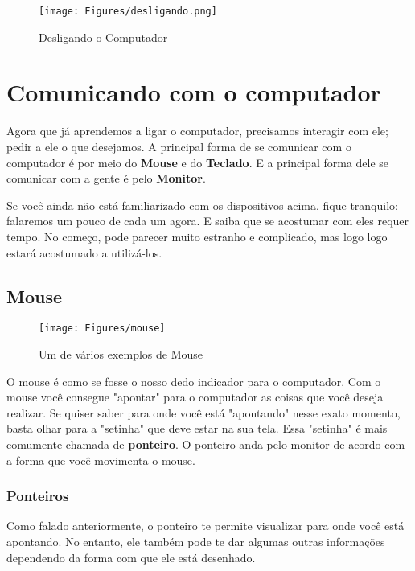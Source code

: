 \documentclass[hidelinks,12pt]{article}
\begin{document}
\begin{figure}[!h]
	\centering
	\texttt{[image: Figures/desligando.png]}
	\caption{Desligando o Computador}
	\label{fig:desligando}
\end{figure}

\newpage

\section{Comunicando com o computador}

Agora que já aprendemos a ligar o computador, precisamos interagir com ele; pedir a ele o que desejamos. A principal forma de se comunicar com o computador é por meio do \textbf{Mouse} e do \textbf{Teclado}. E a principal forma dele se comunicar com a gente é pelo \textbf{Monitor}.

Se você ainda não está familiarizado com os dispositivos acima, fique tranquilo; falaremos um pouco de cada um agora. E saiba que se acostumar com eles requer tempo. No começo, pode parecer muito estranho e complicado, mas logo logo estará acostumado a utilizá-los.

\subsection{Mouse}

\begin{figure}[!h]
	\centering
	\texttt{[image: Figures/mouse]}
	\caption{Um de vários exemplos de Mouse}
	\label{fig:mouse}
\end{figure}

O mouse é como se fosse o nosso dedo indicador para o computador. Com o mouse você consegue "apontar" para o computador as coisas que você deseja realizar. Se quiser saber para onde você está "apontando" nesse exato momento, basta olhar para a "setinha" que deve estar na sua tela. Essa "setinha" é mais comumente chamada de \textbf{ponteiro}. O ponteiro anda pelo monitor de acordo com a forma que você movimenta o mouse. 

\subsubsection{Ponteiros}

Como falado anteriormente, o ponteiro te permite visualizar para onde você está apontando. No entanto, ele também pode te dar algumas outras informações dependendo da forma com que ele está desenhado.
\end{document}
